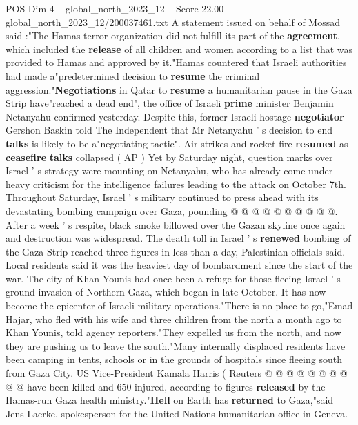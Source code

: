 \begin{textsample}{POS Dim 4 – global\_north\_2023\_12 – Score 22.00 – global\_north\_2023\_12/200037461.txt}  \label{ex:f4_pos_305}
A statement issued on behalf of Mossad said :"The Hamas terror organization did not fulfill its part of the \textbf{agreement}, which included the \textbf{release} of all children and women according to a list that was provided to Hamas and approved by it."Hamas countered that Israeli authorities had made a"predetermined decision to \textbf{resume} the criminal aggression."\textbf{Negotiations} in Qatar to \textbf{resume} a humanitarian pause in the Gaza Strip have"reached a dead end", the office of Israeli \textbf{prime} minister Benjamin Netanyahu confirmed yesterday.
Despite this, former Israeli hostage \textbf{negotiator} Gershon Baskin told The Independent that Mr Netanyahu ' s decision to end \textbf{talks} is likely to be a"negotiating tactic".
Air strikes and rocket fire \textbf{resumed} as \textbf{ceasefire} \textbf{talks} collapsed ( AP ) Yet by Saturday night, question marks over Israel ' s strategy were mounting on Netanyahu, who has already come under heavy criticism for the intelligence failures leading to the attack on October 7th.
Throughout Saturday, Israel ' s military continued to press ahead with its devastating bombing campaign over Gaza, pounding @ @ @ @ @ @ @ @ @ @.
After a week ' s respite, black smoke billowed over the Gazan skyline once again and destruction was widespread.
The death toll in Israel ' s \textbf{renewed} bombing of the Gaza Strip reached three figures in less than a day, Palestinian officials said.
Local residents said it was the heaviest day of bombardment since the start of the war.
The city of Khan Younis had once been a refuge for those fleeing Israel ' s ground invasion of Northern Gaza, which began in late October.
It has now become the epicenter of Israeli military operations."There is no place to go,"Emad Hajar, who fled with his wife and three children from the north a month ago to Khan Younis, told agency reporters."They expelled us from the north, and now they are pushing us to leave the south."Many internally displaced residents have been camping in tents, schools or in the grounds of hospitals since fleeing south from Gaza City.
US Vice-President Kamala Harris ( Reuters @ @ @ @ @ @ @ @ @ @ have been killed and 650 injured, according to figures \textbf{released} by the Hamas-run Gaza health ministry."\textbf{Hell} on Earth has \textbf{returned} to Gaza,"said Jens Laerke, spokesperson for the United Nations humanitarian office in Geneva.

\end{textsample}
